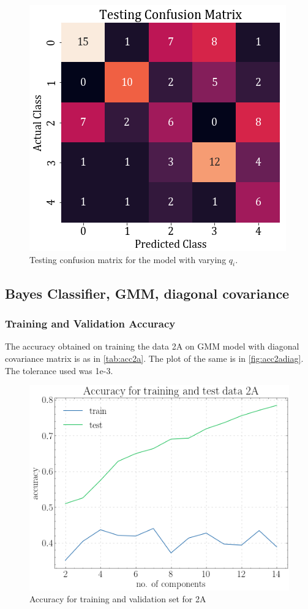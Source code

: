 \documentclass[11pt,a4paper]{article}
\begin{document}
\begin{figure}[H]
    \centering
    \includegraphics[scale=0.5]{images/2a_full_cross_test.png}
    \caption{Testing confusion matrix for the model with varying $q_i$.}
\end{figure}


\subsection{Bayes Classifier, GMM, diagonal covariance}
\subsubsection{Training and Validation Accuracy}
The accuracy obtained on training the data 2A on GMM model with diagonal covariance matrix is as in \autoref{tab:acc2a}. The plot of the same is in \autoref{fig:acc2adiag}. The tolerance used was 1e-3.


\begin{figure}[H]
    \centering
    \includegraphics[scale=0.5]{images/acc_2a.png}
    \caption{Accuracy for training and validation set for 2A}
    \label{fig:acc2adiag}
\end{figure}
\end{document}
